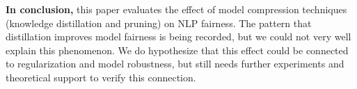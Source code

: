 \noindent \textbf{In conclusion,} \quad this paper evaluates the effect of model compression techniques (knowledge distillation and pruning) on NLP fairness. The pattern that distillation improves model fairness is being recorded, but we could not very well explain this phenomenon. We do hypothesize that this effect could be connected to regularization and model robustness, but still needs further experiments and theoretical support to verify this connection. 




